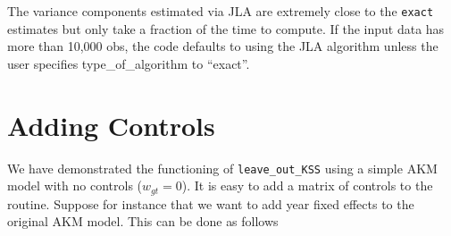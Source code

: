 \documentclass[11pt]{article}
\begin{document}
    The variance components estimated via JLA are extremely close to the
\texttt{exact} estimates but only take a fraction of the time to compute. If
the input data has more than 10,000 obs, the code defaults to using the
JLA algorithm unless the user specifies type\_of\_algorithm to
``exact''.

    \hypertarget{adding-controls}{%
\section{Adding Controls}\label{adding-controls}}

We have demonstrated the functioning of \texttt{leave\_out\_KSS} using a
simple AKM model with no controls (\(w_{gt}=0\)). It is easy to add a
matrix of controls to the routine. Suppose for instance that we want to
add year fixed effects to the original AKM model. This can be done as
follows
\end{document}
